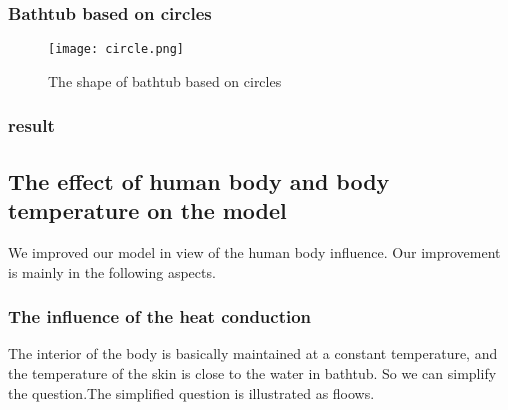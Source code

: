 \documentclass{mcmthesis}
\begin{document}
\subsubsection{Bathtub based on circles}
\begin{figure}[H]
\centerline{\texttt{[image: circle.png]}}
\caption{The shape of bathtub based on circles}
\label{circle}	
\end{figure}
\subsubsection{result}

\subsection{The effect of human body and body temperature on the model}
We improved our model in view of the human body influence. Our improvement is mainly in the following aspects.
\subsubsection{The influence of the heat conduction}%
The interior of the body is basically maintained at a constant temperature, and the temperature of the skin is close to the water in bathtub. So we can simplify the question.The simplified question is illustrated as floows.\\
\end{document}
